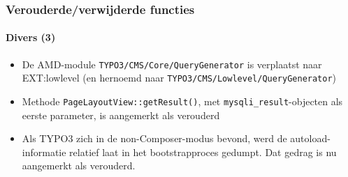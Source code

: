 \begin{frame}[fragile]
	\frametitle{Verouderde/verwijderde functies}
	\framesubtitle{Divers (3)}

	\begin{itemize}

		\item De AMD-module \texttt{TYPO3/CMS/Core/QueryGenerator} is verplaatst naar EXT:lowlevel\newline
			\small
				(en hernoemd naar \texttt{TYPO3/CMS/Lowlevel/QueryGenerator})
			\normalsize

		\item Methode \texttt{PageLayoutView::getResult()}, met \texttt{mysqli\_result}-objecten 
			als eerste parameter, is aangemerkt als verouderd

		\item Als TYPO3 zich in de non-Composer-modus bevond, werd de autoload-informatie relatief laat in het 
			bootstrapproces gedumpt. Dat gedrag is nu aangemerkt als verouderd.
	\end{itemize}

\end{frame}

